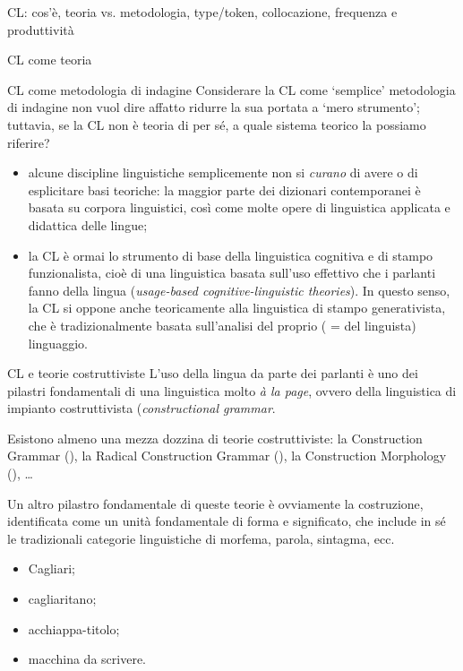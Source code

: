 \documentclass[pdf]{prosper}
\begin{document}
\begin{tsectionandpart}{CL: cos'è, teoria vs. metodologia, type/token, collocazione, frequenza e produttività}
\begin{slide}{CL come teoria}
\end{slide}

\begin{slide}{CL come metodologia di indagine}
Considerare la CL come `semplice' metodologia di indagine non vuol dire affatto ridurre la sua portata a `mero strumento'; tuttavia, se la CL non è teoria di per sé, a quale sistema teorico la possiamo riferire?

\begin{itemize}
	\item alcune discipline linguistiche semplicemente non si {\it curano} di avere o di esplicitare basi teoriche: la maggior parte dei dizionari contemporanei è basata su corpora linguistici, così come molte opere di linguistica applicata e didattica delle lingue;
	\item la CL è ormai lo strumento di base della linguistica cognitiva e di stampo funzionalista, cioè di una linguistica basata sull'uso effettivo che i parlanti fanno della lingua ({\it usage-based cognitive-linguistic theories}). In questo senso, la CL si oppone anche teoricamente alla linguistica di stampo generativista, che è tradizionalmente basata sull'analisi del proprio ( = del linguista) linguaggio.
\end{itemize}
\end{slide}

\begin{slide}{CL e teorie costruttiviste}
L'uso della lingua da parte dei parlanti è uno dei pilastri fondamentali di una linguistica molto {\it à la page}, ovvero della linguistica di impianto costruttivista ({\it constructional grammar}. 

	Esistono almeno una mezza dozzina di teorie costruttiviste: la Construction Grammar (\citealt{Goldberg2013}), la Radical Construction Grammar (\citealt{Croft2001}), la Construction Morphology (\citealt{Booij2010}), \dots

Un altro pilastro fondamentale di queste teorie è ovviamente la costruzione, identificata come un unità fondamentale di forma e significato, che include in sé le tradizionali categorie linguistiche di morfema, parola, sintagma, ecc.

	\begin{itemize}
		\item Cagliari;
		\item cagliaritano;
		\item acchiappa-titolo;
		\item macchina da scrivere.
    	\end{itemize}


\end{slide}
\end{tsectionandpart}
\end{document}
